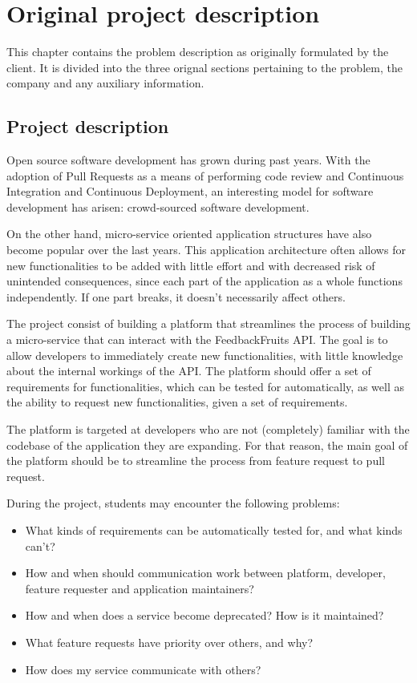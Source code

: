 \chapter{Original project description}
This chapter contains the problem description as originally formulated by the client. It is divided into the three orignal sections pertaining to the problem, the company and any auxiliary information.

\section{Project description}
Open source software development has grown during past years. With the adoption of Pull Requests as a means of performing code review and Continuous Integration and Continuous Deployment, an interesting model for software development has arisen: crowd-sourced software development.

On the other hand, micro-service oriented application structures have also become popular over the last years. This application architecture often allows for new functionalities to be added with little effort and with decreased risk of unintended consequences, since each part of the application as a whole functions independently. If one part breaks, it doesn't necessarily affect others.

The project consist of building a platform that streamlines the process of building a micro-service that can interact with the FeedbackFruits API. The goal is to allow developers to immediately create new functionalities, with little knowledge about the internal workings of the API. The platform should offer a set of requirements for functionalities, which can be tested for automatically, as well as the ability to request new functionalities, given a set of requirements.

The platform is targeted at developers who are not (completely) familiar with the codebase of the application they are expanding. For that reason, the main goal of the platform should be to streamline the process from feature request to pull request.

During the project, students may encounter the following problems:
\begin{itemize}[nosep]
    \item What kinds of requirements can be automatically tested for, and what kinds can't?
    \item How and when should communication work between platform, developer, feature requester and application maintainers?
    \item How and when does a service become deprecated? How is it maintained?
    \item What feature requests have priority over others, and why?
    \item How does my service communicate with others?
\end{itemize}

